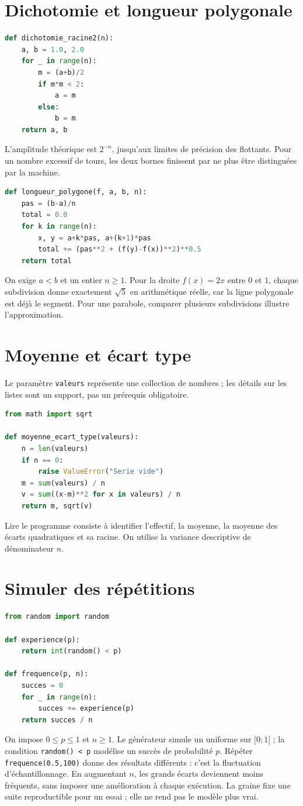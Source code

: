 \documentclass[../cours_2de.tex]{subfiles}
\begin{document}
\section{Dichotomie et longueur polygonale}
\begin{lstlisting}[language=Python]
def dichotomie_racine2(n):
    a, b = 1.0, 2.0
    for _ in range(n):
        m = (a+b)/2
        if m*m < 2:
            a = m
        else:
            b = m
    return a, b
\end{lstlisting}
L'amplitude théorique est $2^{-n}$, jusqu'aux limites de précision des flottants. Pour un nombre excessif de tours, les deux bornes finissent par ne plus être distinguées par la machine.
\begin{lstlisting}[language=Python]
def longueur_polygone(f, a, b, n):
    pas = (b-a)/n
    total = 0.0
    for k in range(n):
        x, y = a+k*pas, a+(k+1)*pas
        total += (pas**2 + (f(y)-f(x))**2)**0.5
    return total
\end{lstlisting}
On exige $a<b$ et un entier $n\geq1$.
Pour la droite $f(x)=2x$ entre $0$ et $1$, chaque subdivision donne exactement $\sqrt5$ en arithmétique réelle, car la ligne polygonale est déjà le segment. Pour une parabole, comparer plusieurs subdivisions illustre l'approximation.
\section{Moyenne et écart type}
Le paramètre \texttt{valeurs} représente une collection de nombres ; les détails sur les listes sont un support, pas un prérequis obligatoire.
\begin{lstlisting}[language=Python]
from math import sqrt

def moyenne_ecart_type(valeurs):
    n = len(valeurs)
    if n == 0:
        raise ValueError("Serie vide")
    m = sum(valeurs) / n
    v = sum((x-m)**2 for x in valeurs) / n
    return m, sqrt(v)
\end{lstlisting}
Lire le programme consiste à identifier l'effectif, la moyenne, la moyenne des écarts quadratiques et sa racine. On utilise la variance descriptive de dénominateur $n$.
\section{Simuler des répétitions}
\begin{lstlisting}[language=Python]
from random import random

def experience(p):
    return int(random() < p)

def frequence(p, n):
    succes = 0
    for _ in range(n):
        succes += experience(p)
    return succes / n
\end{lstlisting}
On impose $0\leq p\leq1$ et $n\geq1$. Le générateur simule un uniforme sur $[0;1[$ ; la condition \texttt{random() < p} modélise un succès de probabilité $p$.
Répéter \texttt{frequence(0.5,100)} donne des résultats différents : c'est la fluctuation d'échantillonnage. En augmentant $n$, les grands écarts deviennent moins fréquents, sans imposer une amélioration à chaque exécution.
La graine fixe une suite reproductible pour un essai ; elle ne rend pas le modèle plus vrai.
\end{document}
